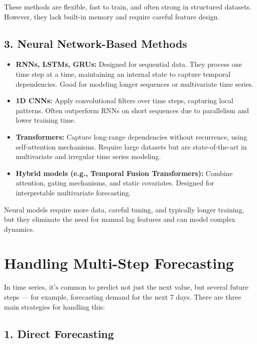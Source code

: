 \documentclass[12pt,openany, draft]{book}
\begin{document}
These methods are flexible, fast to train, and often strong in structured datasets. However, they lack built-in memory and require careful feature design.

\subsection*{3. Neural Network-Based Methods}

\begin{itemize}
    \item \textbf{RNNs, LSTMs, GRUs:} Designed for sequential data. They process one time step at a time, maintaining an internal state to capture temporal dependencies. Good for modeling longer sequences or multivariate time series.

    \item \textbf{1D CNNs:} Apply convolutional filters over time steps, capturing local patterns. Often outperform RNNs on short sequences due to parallelism and lower training time.

    \item \textbf{Transformers:} Capture long-range dependencies without recurrence, using self-attention mechanisms. Require large datasets but are state-of-the-art in multivariate and irregular time series modeling.

    \item \textbf{Hybrid models (e.g., Temporal Fusion Transformers):} Combine attention, gating mechanisms, and static covariates. Designed for interpretable multivariate forecasting.
\end{itemize}

Neural models require more data, careful tuning, and typically longer training, but they eliminate the need for manual lag features and can model complex dynamics.


\section{Handling Multi-Step Forecasting}

In time series, it’s common to predict not just the next value, but several future steps — for example, forecasting demand for the next 7 days. There are three main strategies for handling this:

\subsection*{1. Direct Forecasting}
\end{document}
